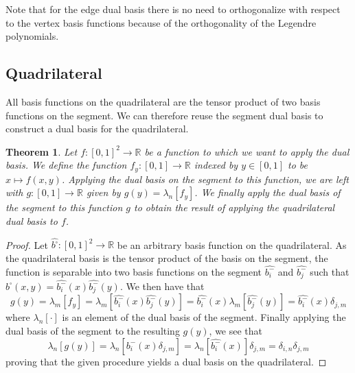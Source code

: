 \documentclass[10pt,a4paper]{article}
\newtheorem{thm}{Theorem}
\begin{document}
    Note that for the edge dual basis there is no need to orthogonalize with respect to the vertex basis functions because of the orthogonality of the Legendre polynomials.


\subsection{Quadrilateral}

    All basis functions on the quadrilateral are the tensor product of two basis functions on the segment. We can therefore reuse the segment dual basis to construct a dual basis for the quadrilateral.
    
    \begin{thm}
        Let $f : [0,1]^2 \to \mathbb{R}$ be a function to which we want to apply the dual basis. We define the function $f_y : [0,1] \to \mathbb{R}$ indexed by $y \in [0,1]$ to be $x \mapsto f(x, y)$. Applying the dual basis on the segment to this function, we are left with $g : [0,1] \to \mathbb{R}$ given by $g(y) = \lambda_n[f_y]$. We finally apply the dual basis of the segment to this function $g$ to obtain the result of applying the quadrilateral dual basis to $f$.
    \end{thm}
    \begin{proof}
        Let $\widehat{b^{\square}} : [0,1]^2 \to \mathbb{R}$ be an arbitrary basis function on the quadrilateral. As the quadrilateral basis is the tensor product of the basis on the segment, the function is separable into two basis functions on the segment $\widehat{b_i^{-}}$ and $\widehat{b_j^{-}}$ such that $\widehat{b^{\square}}(x,y) = \widehat{b_i^{-}}(x)\widehat{b_j^{-}}(y)$. We then have that
        \begin{equation*}
            g(y) = \lambda_m[f_y] = \lambda_m[\widehat{b_i^{-}}(x)\widehat{b_j^{-}}(y)] = \widehat{b_i^{-}}(x)\lambda_m[\widehat{b_j^{-}}(y)] = \widehat{b_i^{-}}(x)\delta_{j,m}
        \end{equation*}
        where $\lambda_n[\cdot]$ is an element of the dual basis of the segment. Finally applying the dual basis of the segment to the resulting $g(y)$, we see that
        \begin{equation*}
            \lambda_n[g(y)] = \lambda_n[\widehat{b_i^{-}}(x)\delta_{j,m}] = \lambda_n[\widehat{b_i^{-}}(x)]\delta_{j,m} = \delta_{i,n}\delta_{j,m}
        \end{equation*}
        proving that the given procedure yields a dual basis on the quadrilateral.
    \end{proof}
\end{document}
